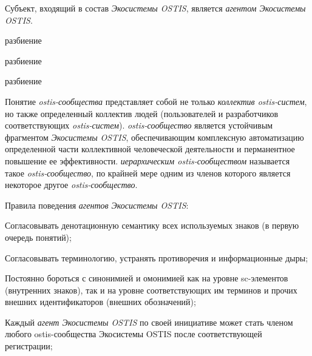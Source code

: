 Субъект, входящий в состав \textit{Экосистемы OSTIS}, является \textit{агентом Экосистемы OSTIS}.

\begin{SCn}
\begin{scnrelfromset}{разбиение}
	\begin{scnindent}
    \begin{scnrelfromset}{разбиение}
    \end{scnrelfromset}
	\end{scnindent}
	\begin{scnindent}
    \begin{scnrelfromset}{разбиение}
    \end{scnrelfromset}
	\end{scnindent}
\end{scnrelfromset}
\end{SCn}

Понятие \textit{ostis-сообщества} представляет собой не только \textit{коллектив ostis-систем}, но также определенный коллектив людей (пользователей и разработчиков соответствующих \textit{ostis-систем}). 
\textit{ostis-сообщество} является устойчивым фрагментом \textit{Экосистемы OSTIS}, обеспечивающим комплексную автоматизацию определенной части коллективной человеческой деятельности и перманентное повышение ее эффективности. 
\textit{иерархическим ostis-сообществом} называется такое \textit{ostis-сообщество}, по крайней мере одним из членов которого является некоторое другое \textit{ostis-сообщество}.

Правила поведения \textit{агентов Экосистемы OSTIS}:
\begin{textitemize}
    \item Согласовывать денотационную семантику всех используемых знаков (в первую очередь понятий);
    \item Согласовывать терминологию, устранять противоречия и информационные дыры;
    \item Постоянно бороться с синонимией и омонимией как на уровне sc-элементов (внутренних знаков), так и на уровне соответствующих им терминов и прочих внешних идентификаторов (внешних обозначений);
    \item Каждый \textit{агент Экосистемы OSTIS} по своей инициативе может стать членом любого ostis-сообщества Экосистемы OSTIS после соответствующей регистрации;
\end{textitemize}

